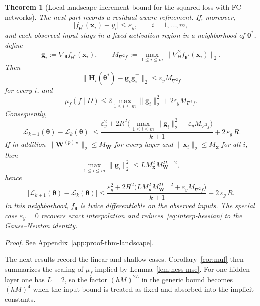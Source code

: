 \documentclass[10pt,letterpaper]{article}
\newtheorem{theorem}{Theorem}
\theoremstyle{definition}
\begin{document}
\begin{theorem}[Local landscape increment bound for the squared loss with FC networks]
The next part records a residual-aware refinement.
If, moreover,
\[
  \bigl|f_{\boldsymbol{\theta}^*}(\mathbf{x}_i)-y_i\bigr|\le \varepsilon_y,
  \qquad i=1,\dots,m,
\]
and each observed input stays in a fixed activation region in a neighborhood of $\boldsymbol{\theta}^*$, define
\[
  \mathbf{g}_i:=\nabla_{\boldsymbol{\theta}}f_{\boldsymbol{\theta}^*}(\mathbf{x}_i),
  \qquad
  M_{\nabla^2 f}:=
  \max_{1\le i\le m}\bigl\|\nabla_{\boldsymbol{\theta}}^2 f_{\boldsymbol{\theta}^*}(\mathbf{x}_i)\bigr\|_2 .
\]
Then
\begin{equation}\label{eq:interp-hessian}
  \bigl\|
    \mathbf{H}_i(\boldsymbol{\theta}^*)
    - \mathbf{g}_i\mathbf{g}_i^\top
  \bigr\|_2
  \le \varepsilon_y M_{\nabla^2 f}
\end{equation}
for every $i$, and
\begin{equation}\label{eq:muf-interp-general}
  \mu_f(f\mid D)\le
  2\max_{1\le i\le m}\|\mathbf{g}_i\|_2^2
  + 2\varepsilon_y M_{\nabla^2 f} .
\end{equation}
Consequently,
\begin{equation}\label{eq:thm-bound-interp}
  \bigl|\mathcal{L}_{k+1}(\boldsymbol{\theta}) - \mathcal{L}_k(\boldsymbol{\theta})\bigr|
  \le
  \frac{\varepsilon_y^2 + 2R^2\bigl(\max_{1\le i\le m}\|\mathbf{g}_i\|_2^2 + \varepsilon_y M_{\nabla^2 f}\bigr)}{k+1}
  + 2\,\varepsilon_g\,R .
\end{equation}
If in addition $\|\mathbf{W}^{(p)\star}\|_2\le M_{\mathbf{W}}$ for every layer and $\|\mathbf{x}_i\|_2\le M_{\mathbf{x}}$ for all $i$, then
\begin{equation}\label{eq:grad-interp-general}
  \max_{1\le i\le m}\|\mathbf{g}_i\|_2^2
  \le L M_{\mathbf{x}}^2 M_{\mathbf{W}}^{2L-2},
\end{equation}
hence
\begin{equation}\label{eq:rate-interp}
  \bigl|\mathcal{L}_{k+1}(\boldsymbol{\theta}) - \mathcal{L}_k(\boldsymbol{\theta})\bigr|
  \le
  \frac{\varepsilon_y^2 + 2R^2\bigl(L M_{\mathbf{x}}^2 M_{\mathbf{W}}^{2L-2} + \varepsilon_y M_{\nabla^2 f}\bigr)}{k+1}
  + 2\,\varepsilon_g\,R .
\end{equation}
In this neighborhood, $f_{\boldsymbol{\theta}}$ is twice differentiable on the observed inputs. The special case $\varepsilon_y=0$ recovers exact interpolation and reduces~\eqref{eq:interp-hessian} to the Gauss--Newton identity.
\end{theorem}
\noindent\textit{Proof.} See Appendix~\ref{app:proof-thm-landscape}.

The next results record the linear and shallow cases. Corollary~\ref{cor:muf} then summarizes the scaling of $\mu_f$ implied by Lemma~\ref{lem:hess-mse}.
For one hidden layer one has $L=2$, so the factor $(hM)^{2L}$ in the generic bound becomes $(hM)^4$ when the input bound is treated as fixed and absorbed into the implicit constants.
\end{document}
